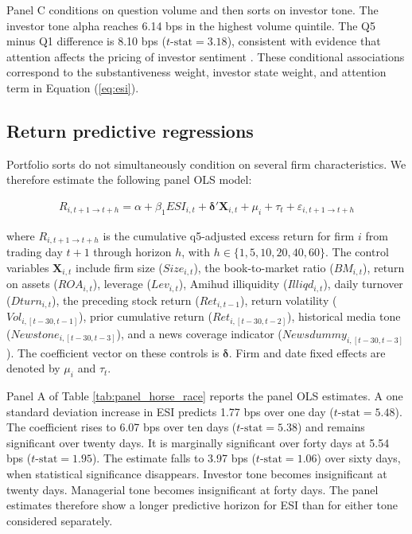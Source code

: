 \documentclass[12pt]{article}
\begin{document}
Panel C conditions on question volume and then sorts on investor tone. The investor tone alpha reaches 6.14 bps in the highest volume quintile. The Q5 minus Q1 difference is 8.10 bps ($t\text{-stat} = 3.18$), consistent with evidence that attention affects the pricing of investor sentiment \citep{barber2022attention,da2011}. These conditional associations correspond to the substantiveness weight, investor state weight, and attention term in Equation (\ref{eq:esi}).

\subsection{Return predictive regressions}

Portfolio sorts do not simultaneously condition on several firm characteristics. We therefore estimate the following panel OLS model:

\begin{equation}
\label{eq:rpr}
\begin{aligned}
 R_{i, t+1 \to t+h} = \alpha + \beta_1 ESI_{i,t} + \boldsymbol{\delta}'\mathbf{X}_{i,t} + \mu_i + \tau_t + \varepsilon_{i, t+1 \to t+h}
\end{aligned}
\end{equation}

\noindent where $R_{i,t+1 \to t+h}$ is the cumulative q5-adjusted excess return for firm $i$ from trading day $t+1$ through horizon $h$, with $h \in \{1, 5, 10, 20, 40, 60\}$. The control variables $\mathbf{X}_{i,t}$ include firm size ($Size_{i,t}$), the book-to-market ratio ($BM_{i,t}$), return on assets ($ROA_{i,t}$), leverage ($Lev_{i,t}$), Amihud illiquidity ($Illiqd_{i,t}$), daily turnover ($Dturn_{i,t}$), the preceding stock return ($Ret_{i,t-1}$), return volatility ($Vol_{i,[t-30,t-1]}$), prior cumulative return ($Ret_{i,[t-30,t-2]}$), historical media tone ($Newstone_{i,[t-30,t-3]}$), and a news coverage indicator ($Newsdummy_{i,[t-30,t-3]}$). The coefficient vector on these controls is $\boldsymbol{\delta}$. Firm and date fixed effects are denoted by $\mu_i$ and $\tau_t$.

Panel A of Table \ref{tab:panel_horse_race} reports the panel OLS estimates. A one standard deviation increase in ESI predicts 1.77 bps over one day ($t\text{-stat} = 5.48$). The coefficient rises to 6.07 bps over ten days ($t\text{-stat} = 5.38$) and remains significant over twenty days. It is marginally significant over forty days at 5.54 bps ($t\text{-stat} = 1.95$). The estimate falls to 3.97 bps ($t\text{-stat} = 1.06$) over sixty days, when statistical significance disappears. Investor tone becomes insignificant at twenty days. Managerial tone becomes insignificant at forty days. The panel estimates therefore show a longer predictive horizon for ESI than for either tone considered separately.
\end{document}
